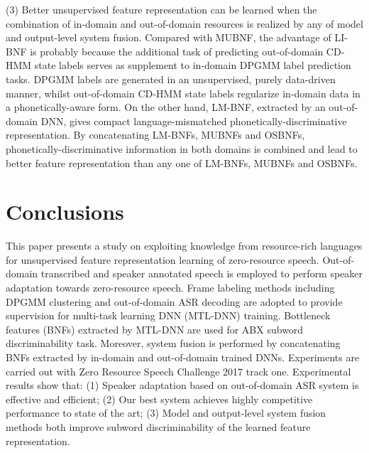 \documentclass[a4paper]{article}
\begin{document}
(3) Better unsupervised feature representation can be learned when the combination of in-domain and out-of-domain resources is realized by any of model and output-level system fusion.  
Compared with MUBNF, the advantage of LI-BNF is probably because the additional task of predicting out-of-domain CD-HMM state labels serves as supplement to in-domain DPGMM label prediction tasks. DPGMM labels are generated in an unsupervised, purely data-driven manner, whilst out-of-domain CD-HMM state labels regularize in-domain data in a phonetically-aware form. On the other hand, LM-BNF, extracted by an out-of-domain DNN, gives compact language-mismatched phonetically-discriminative representation.  By concatenating LM-BNFs, MUBNFs and OSBNFs, phonetically-discriminative information in both domains is combined and lead to better  feature representation than any one of LM-BNFs, MUBNFs and OSBNFs.

\section{Conclusions}
This paper presents a study on exploiting knowledge from resource-rich languages for unsupervised feature representation learning of zero-resource speech. Out-of-domain transcribed and speaker annotated speech is employed to perform speaker adaptation towards zero-resource speech. Frame labeling methods including DPGMM clustering and out-of-domain ASR decoding are adopted to provide supervision for multi-task learning DNN (MTL-DNN) training. Bottleneck features (BNFs) extracted by MTL-DNN are used for ABX subword discriminability task. Moreover, system fusion is performed by concatenating BNFs extracted by in-domain and out-of-domain trained DNNs.
Experiments are carried out with Zero Resource Speech Challenge 2017 track one. Experimental results show that: (1) Speaker adaptation based on out-of-domain ASR system is effective and efficient; (2) Our best system achieves highly competitive performance to state of the art; (3) Model and output-level system fusion methods both improve subword discriminability of the learned feature representation. 
\end{document}
